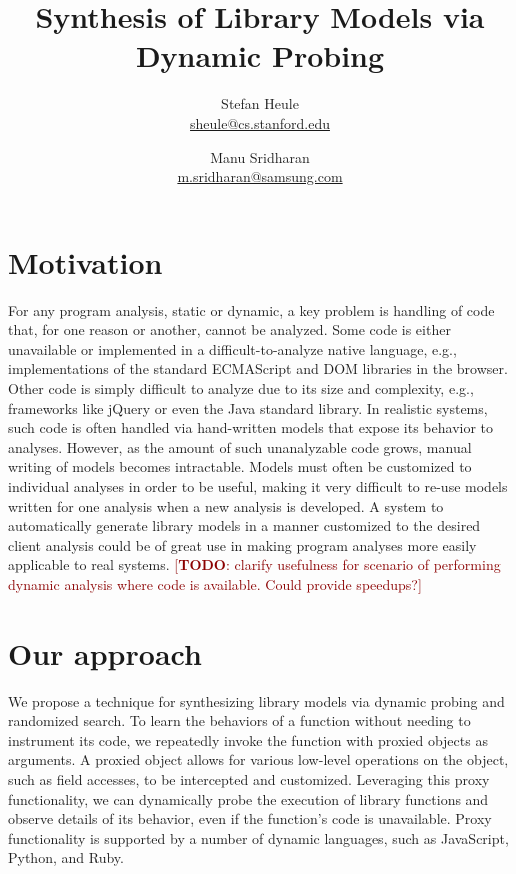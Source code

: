 \documentclass[]{article}
\title{Synthesis of Library Models via Dynamic Probing}
\author{
  Stefan Heule\\\url{sheule@cs.stanford.edu}
  \and
  Manu Sridharan\\\url{m.sridharan@samsung.com}
}
\newcommand{\todo}[1]{{\textcolor{DarkRed}{ [\textbf{TODO}: #1]}}}
\begin{document}
\maketitle



\section*{Motivation}

For any program analysis, static or dynamic, a key problem is handling of code
that, for one reason or another, cannot be analyzed.  Some code is either
unavailable or implemented in a difficult-to-analyze native language, e.g.,
implementations of the standard ECMAScript and DOM libraries in the browser.
Other code is simply difficult to analyze due to its size and complexity, e.g.,
frameworks like jQuery or even the Java standard library.  In realistic systems,
such code is often handled via hand-written models that expose its behavior to
analyses.  However, as the amount of such unanalyzable code grows, manual
writing of models becomes intractable. Models must often be customized to
individual analyses in order to be useful, making it very difficult to re-use
models written for one analysis when a new analysis is developed.  A system to
automatically generate library models in a manner customized to the desired
client analysis could be of great use in making program analyses more easily
applicable to real systems.
\todo{clarify usefulness for scenario of performing
  dynamic analysis where code is available.  Could provide speedups?}


\section*{Our approach}

We propose a technique for synthesizing library models via dynamic probing and
randomized search.  To learn the behaviors of a function without needing to
instrument its code, we repeatedly invoke the function with proxied objects as
arguments.  A proxied object allows for various low-level operations on the
object, such as field accesses, to be intercepted and customized.  Leveraging
this proxy functionality, we can dynamically probe the execution of library
functions and observe details of its behavior, even if the function’s code is
unavailable.  Proxy functionality is supported by a number of dynamic languages,
such as JavaScript, Python, and Ruby.
\end{document}
